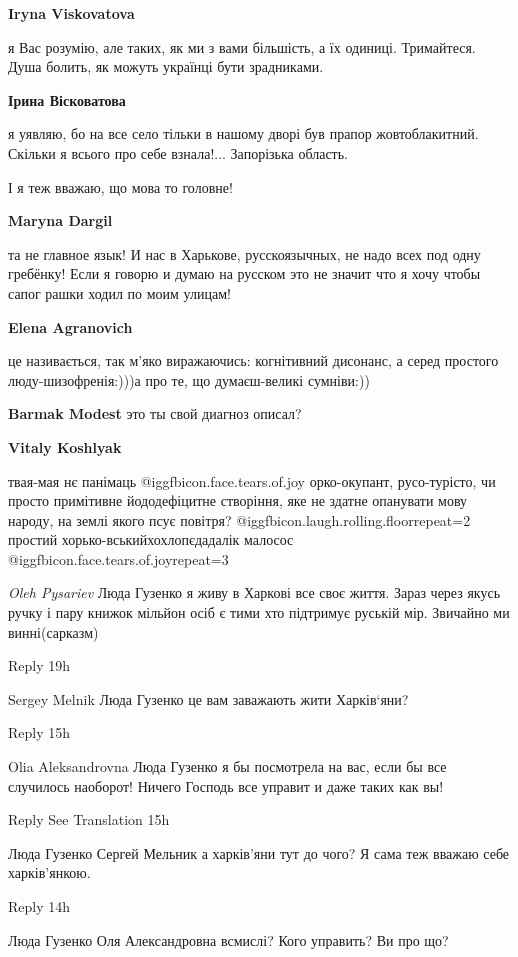 \begin{itemize}
\begin{itemize}
\textbf{Iryna Viskovatova} 

я Вас розумію, але таких, як ми з вами більшість, а їх одиниці. Тримайтеся.
Душа болить, як можуть українці бути зрадниками.

\textbf{Ірина Вісковатова} 

я уявляю, бо на все село тільки в нашому дворі був прапор жовтоблакитний.
Скільки я всього про себе взнала!... Запорізька область.

І я теж вважаю, що мова то головне!

\textbf{Maryna Dargil} 

та не главное язык! И нас в Харькове, русскоязычных, не надо всех под одну
гребёнку! Если я говорю и думаю на русском это не значит что я хочу чтобы сапог
рашки ходил по моим улицам!

\textbf{Elena Agranovich} 

це називається, так м'яко виражаючись: когнітивний дисонанс, а серед простого люду-шизофренія:)))а про те, що думаєш-великі сумніви:))

\textbf{Barmak Modest} это ты свой диагноз описал?

\textbf{Vitaly Koshlyak} 

твая-мая нє панімаць @igg{fbicon.face.tears.of.joy} орко-окупант, русо-турісто, чи просто примітивне
йододефіцитне створіння, яке не здатне опанувати мову народу, на землі якого псує
повітря?  @igg{fbicon.laugh.rolling.floor}{repeat=2} простий хорько-вськийхохлопєдадалік малосос @igg{fbicon.face.tears.of.joy}{repeat=3} 

\emph{Oleh Pysariev}
Люда Гузенко я живу в Харкові все своє життя. Зараз через якусь ручку і пару книжок мільйон осіб є тими хто підтримує руській мір. Звичайно ми винні(сарказм)

    Reply
    19h

Sergey Melnik
Люда Гузенко це вам заважають жити Харків‘яни?

    Reply
    15h

Olia Aleksandrovna
Люда Гузенко я бы посмотрела на вас, если бы все случилось наоборот! Ничего
Господь все управит и даже таких как вы!

    Reply
    See Translation
    15h

Люда Гузенко
Сергей Мельник а харків'яни тут до чого? Я сама теж вважаю себе харків'янкою.

    Reply
    14h

Люда Гузенко
Оля Александровна всмислі? Кого управить? Ви про що?

\end{itemize} %


\end{itemize} %
